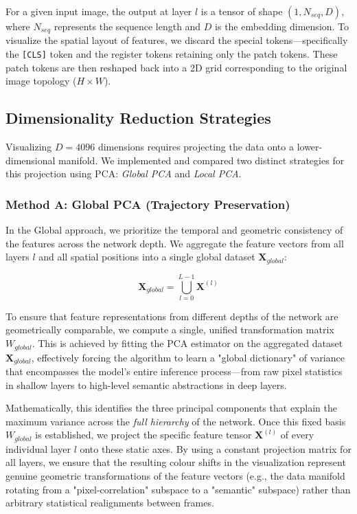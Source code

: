 \documentclass[oneside]{ctuthesis}
\begin{document}
For a given input image, the output at layer $l$ is a tensor of shape $(1, N_{seq}, D)$, where $N_{seq}$ represents the sequence length and $D$ is the embedding dimension. To visualize the spatial layout of features, we discard the special tokens—specifically the \texttt{[CLS]} token and the register tokens retaining only the patch tokens. These patch tokens are then reshaped back into a 2D grid corresponding to the original image topology ($H \times W$).

\subsection{Dimensionality Reduction Strategies}
Visualizing $D=4096$ dimensions requires projecting the data onto a lower-dimensional manifold. We implemented and compared two distinct strategies for this projection using PCA: \textit{Global PCA} and \textit{Local PCA}.

\subsubsection{Method A: Global PCA (Trajectory Preservation)}
\label{sec:method_a_global_pca}
In the Global approach, we prioritize the temporal and geometric consistency of the features across the network depth. We aggregate the feature vectors from all layers $l$ and all spatial positions into a single global dataset $\mathbf{X}_{global}$:

\begin{equation}
    \mathbf{X}_{global} = \bigcup_{l=0}^{L-1} \mathbf{X}^{(l)}
\end{equation}

To ensure that feature representations from different depths of the network are geometrically comparable, we compute a single, unified transformation matrix $W_{global}$. This is achieved by fitting the PCA estimator on the aggregated dataset $\mathbf{X}_{global}$, effectively forcing the algorithm to learn a "global dictionary" of variance that encompasses the model's entire inference process—from raw pixel statistics in shallow layers to high-level semantic abstractions in deep layers.

Mathematically, this identifies the three principal components that explain the maximum variance across the \textit{full hierarchy} of the network. Once this fixed basis $W_{global}$ is established, we project the specific feature tensor $\mathbf{X}^{(l)}$ of every individual layer $l$ onto these static axes. By using a constant projection matrix for all layers, we ensure that the resulting colour shifts in the visualization represent genuine geometric transformations of the feature vectors (e.g., the data manifold rotating from a "pixel-correlation" subspace to a "semantic" subspace) rather than arbitrary statistical realignments between frames.
\end{document}
